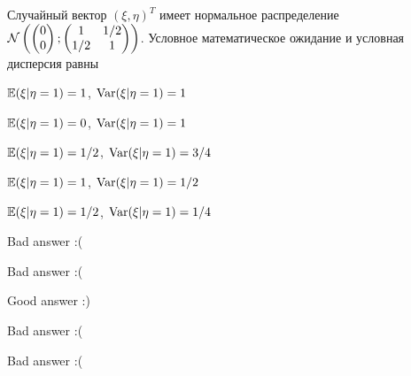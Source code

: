 
\begin{question}
Случайный вектор \((\xi, \eta)^T\) имеет нормальное распределение
\(\mathcal{N} \left( \begin{pmatrix} 0 \\ 0 \end{pmatrix}; \begin{pmatrix} 1 & 1/2 \\ 1/2 & 1 \end{pmatrix} \right)\).
Условное математическое ожидание и условная дисперсия равны
\begin{answerlist}
  \item \(\operatorname{\mathbb{E}}(\xi | \eta=1)=1\), \(\operatorname{Var}(\xi | \eta=1)=1\)
  \item \(\operatorname{\mathbb{E}}(\xi | \eta=1)=0\), \(\operatorname{Var}(\xi | \eta=1)=1\)
  \item \(\operatorname{\mathbb{E}}(\xi | \eta=1)=1/2\), \(\operatorname{Var}(\xi | \eta=1)=3/4\)
  \item \(\operatorname{\mathbb{E}}(\xi | \eta=1)=1\), \(\operatorname{Var}(\xi | \eta=1)=1/2\)
  \item \(\operatorname{\mathbb{E}}(\xi | \eta=1)=1/2\), \(\operatorname{Var}(\xi | \eta=1)=1/4\)
\end{answerlist}
\end{question}

\begin{solution}
\begin{answerlist}
  \item Bad answer :(
  \item Bad answer :(
  \item Good answer :)
  \item Bad answer :(
  \item Bad answer :(
\end{answerlist}
\end{solution}

